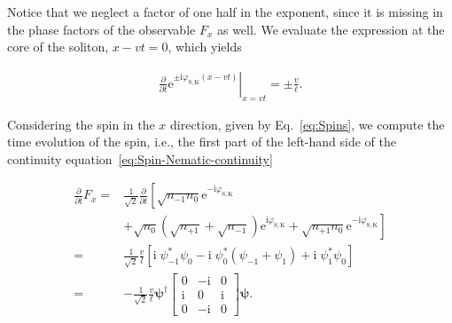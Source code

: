 \documentclass[aps,

               pra,
               twocolumn,
               amsmath,
               amssymb,
               superscriptaddress,
               reprint,
               10pt
              ]{revtex4-2}
\newcommand{\e}{\mathrm{e}}
\begin{document}
\begin{appendix}
Notice that we neglect a factor of one half in the exponent, since it is missing in the phase factors of the observable $F_x$ as well.
We evaluate the expression at the core of the soliton, $x-vt=0$,
which yields

\begin{align}
     \left.\frac{\partial }{\partial t} \e^{\pm \mathrm{i} \varphi_{\mathrm{S}, \mathrm{K}}(x-vt)}\right|_{x=vt}=  \pm \frac{v}{\ell} .
\end{align}

Considering the spin in the $x$ direction, given by Eq.~\eqref{eq:Spins}, we compute the time evolution of the spin, i.e., the first part of the left-hand side of the continuity equation~\eqref{eq:Spin-Nematic-continuity}

\begin{align}
    \frac{\partial}{\partial t} F_x =
    &\frac{1}{\sqrt{2}} \frac{\partial}{\partial t} \left[\sqrt{n_{-1}n_0}\e^{-\mathrm{i} \varphi_{\mathrm{S},\mathrm{K}}}\right. \nonumber \\
    &+ \left.\sqrt{n_0}(\sqrt{n_{+1}}+ \sqrt{n_{-1}})\e^{\mathrm{i} \varphi_{\mathrm{S},\mathrm{K}}} + \sqrt{n_{+1}n_0} \e^{-\mathrm{i} \varphi_{\mathrm{S},\mathrm{K}}} \right] \nonumber \\
    = &\frac{1}{\sqrt{2}}\frac{v}{l} \left[\mathrm{i} \; \psi^*_{-1}\psi_0 -\mathrm{i} \; \psi_0^*(\psi_{-1} + \psi_1) +\mathrm{i} \;\psi^*_{1}\psi_0\right] \\
    = &-\frac{1}{\sqrt{2}} \frac{v}{\ell}\boldsymbol{\psi}^{\dagger}
     \begin{bmatrix}
0 & -\mathrm{i} & 0 \\
\mathrm{i} & 0 & \mathrm{i} \\
0 & -\mathrm{i} & 0
\end{bmatrix}
\boldsymbol{\psi}.
    \label{eq:RHSconteq_filledout}
\end{align}


\end{appendix}
\end{document}
